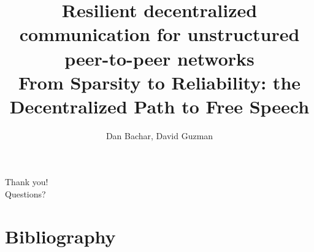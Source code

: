 \documentclass[NET,english,beameralt]{tumbeamer}
\author[D. Bachar]{Dan Bachar, \textnormal{David Guzman}}
\title[Sparsity to Reliability]{Resilient decentralized communication for unstructured peer-to-peer networks\\ \small From Sparsity to Reliability: the Decentralized Path to Free Speech}
\begin{document}












\section{}
\begin{frame}{}
    \vspace{2cm}
    \begin{center}
        {\LARGE Thank you!}\\
        {\LARGE Questions?}
    \end{center}
\end{frame}

\section{Bibliography}
\begin{frame}[allowframebreaks]
     
    
    \nocite{*} 
    
     
\end{frame}


\end{document}
